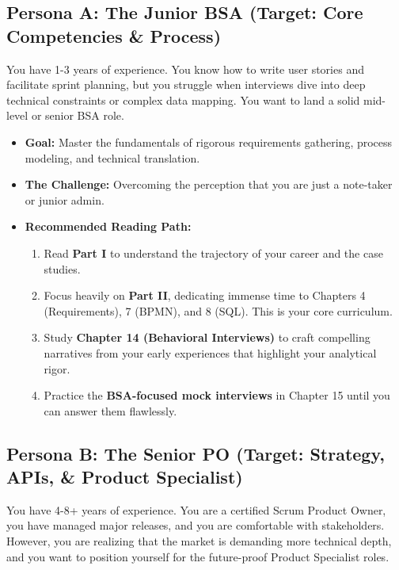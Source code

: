 \documentclass[
  11pt,
  openany,
  oneside]{book}
\providecommand{\tightlist}{%
  \setlength{\itemsep}{0pt}\setlength{\parskip}{0pt}}
\begin{document}
\subsection{Persona A: The Junior BSA (Target: Core Competencies \&
Process)}\label{persona-a-the-junior-bsa-target-core-competencies-process}

You have 1-3 years of experience. You know how to write user stories and
facilitate sprint planning, but you struggle when interviews dive into
deep technical constraints or complex data mapping. You want to land a
solid mid-level or senior BSA role.

\begin{itemize}
\tightlist
\item
  \textbf{Goal:} Master the fundamentals of rigorous requirements
  gathering, process modeling, and technical translation.
\item
  \textbf{The Challenge:} Overcoming the perception that you are just a
  note-taker or junior admin.
\item
  \textbf{Recommended Reading Path:}

  \begin{enumerate}
  \def\labelenumi{\arabic{enumi}.}
  \tightlist
  \item
    Read \textbf{Part I} to understand the trajectory of your career and
    the case studies.
  \item
    Focus heavily on \textbf{Part II}, dedicating immense time to
    Chapters 4 (Requirements), 7 (BPMN), and 8 (SQL). This is your core
    curriculum.
  \item
    Study \textbf{Chapter 14 (Behavioral Interviews)} to craft
    compelling narratives from your early experiences that highlight
    your analytical rigor.
  \item
    Practice the \textbf{BSA-focused mock interviews} in Chapter 15
    until you can answer them flawlessly.
  \end{enumerate}
\end{itemize}

\subsection{Persona B: The Senior PO (Target: Strategy, APIs, \& Product
Specialist)}\label{persona-b-the-senior-po-target-strategy-apis-product-specialist}

You have 4-8+ years of experience. You are a certified Scrum Product
Owner, you have managed major releases, and you are comfortable with
stakeholders. However, you are realizing that the market is demanding
more technical depth, and you want to position yourself for the
future-proof Product Specialist roles.
\end{document}
